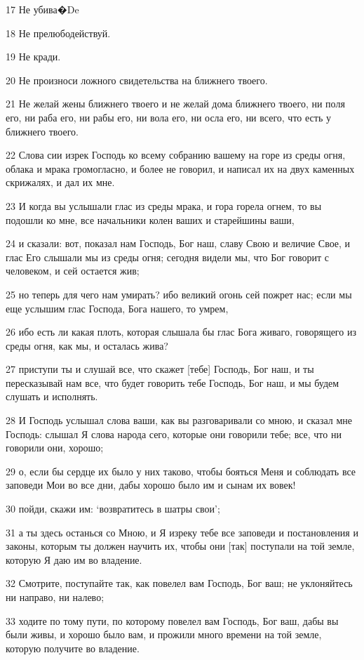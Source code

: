 \par 17 Не убива�De
\par 18 Не прелюбодействуй.
\par 19 Не кради.
\par 20 Не произноси ложного свидетельства на ближнего твоего.
\par 21 Не желай жены ближнего твоего и не желай дома ближнего твоего, ни поля его, ни раба его, ни рабы его, ни вола его, ни осла его, ни всего, что есть у ближнего твоего.
\par 22 Слова сии изрек Господь ко всему собранию вашему на горе из среды огня, облака и мрака громогласно, и более не говорил, и написал их на двух каменных скрижалях, и дал их мне.
\par 23 И когда вы услышали глас из среды мрака, и гора горела огнем, то вы подошли ко мне, все начальники колен ваших и старейшины ваши,
\par 24 и сказали: вот, показал нам Господь, Бог наш, славу Свою и величие Свое, и глас Его слышали мы из среды огня; сегодня видели мы, что Бог говорит с человеком, и сей остается жив;
\par 25 но теперь для чего нам умирать? ибо великий огонь сей пожрет нас; если мы еще услышим глас Господа, Бога нашего, то умрем,
\par 26 ибо есть ли какая плоть, которая слышала бы глас Бога живаго, говорящего из среды огня, как мы, и осталась жива?
\par 27 приступи ты и слушай все, что скажет [тебе] Господь, Бог наш, и ты пересказывай нам все, что будет говорить тебе Господь, Бог наш, и мы будем слушать и исполнять.
\par 28 И Господь услышал слова ваши, как вы разговаривали со мною, и сказал мне Господь: слышал Я слова народа сего, которые они говорили тебе; все, что ни говорили они, хорошо;
\par 29 о, если бы сердце их было у них таково, чтобы бояться Меня и соблюдать все заповеди Мои во все дни, дабы хорошо было им и сынам их вовек!
\par 30 пойди, скажи им: `возвратитесь в шатры свои';
\par 31 а ты здесь останься со Мною, и Я изреку тебе все заповеди и постановления и законы, которым ты должен научить их, чтобы они [так] поступали на той земле, которую Я даю им во владение.
\par 32 Смотрите, поступайте так, как повелел вам Господь, Бог ваш; не уклоняйтесь ни направо, ни налево;
\par 33 ходите по тому пути, по которому повелел вам Господь, Бог ваш, дабы вы были живы, и хорошо было вам, и прожили много времени на той земле, которую получите во владение.


